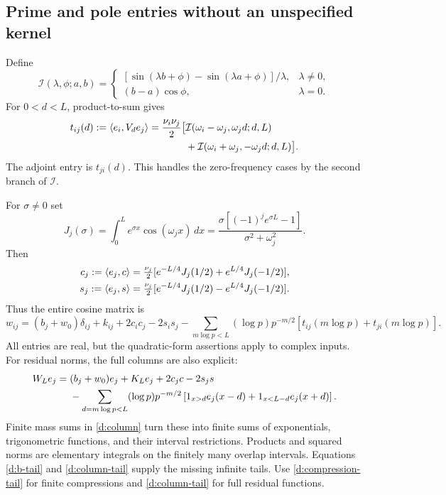 \subsection{Prime and pole entries without an unspecified kernel}
Define
\[
\mathcal I(\lambda,\phi;a,b)=
\begin{cases}
[\sin(\lambda b+\phi)-\sin(\lambda a+\phi)]/\lambda,&\lambda\ne0,\\
(b-a)\cos\phi,&\lambda=0.
\end{cases}
\]
For $0<d<L$, product-to-sum gives
\begin{align}
t_{ij}(d):=\left\langle e_i,V_de_j\right\rangle
=\frac{\nu_i\nu_j}{2}\bigl[&\mathcal I(\omega_i-\omega_j,\omega_jd;d,L)\notag\\
&+\mathcal I(\omega_i+\omega_j,-\omega_jd;d,L)\bigr].
\label{d:shift-entries}
\end{align}
The adjoint entry is $t_{ji}(d)$. This handles the zero-frequency cases
by the second branch of $\mathcal I$.

For $\sigma\ne0$ set
\[
J_j(\sigma)=\int_0^Le^{\sigma x}\cos(\omega_jx)\,dx
=\frac{\sigma[(-1)^je^{\sigma L}-1]}{\sigma^2+\omega_j^2}.
\]
Then
\begin{align*}
c_j:=\left\langle e_j,c\right\rangle&=\tfrac{\nu_j}{2}
[e^{-L/4}J_j(1/2)+e^{L/4}J_j(-1/2)],\\
s_j:=\left\langle e_j,s\right\rangle&=\tfrac{\nu_j}{2}
[e^{-L/4}J_j(1/2)-e^{L/4}J_j(-1/2)].
\end{align*}
Thus the entire cosine matrix is
\begin{equation}\label{d:W-entries}
w_{ij}=(b_j+w_0)\delta_{ij}+k_{ij}+2c_ic_j-2s_is_j
-\sum_{m\log p<L}(\log p)p^{-m/2}
[t_{ij}(m\log p)+t_{ji}(m\log p)].
\end{equation}
All entries are real, but the quadratic-form assertions apply to complex
inputs. For residual norms, the full columns are also explicit:
\begin{align}
W_Le_j={}&(b_j+w_0)e_j+K_Le_j+2c_jc-2s_js\notag\\
&-\sum_{d=m\log p<L}(\log p)p^{-m/2}
\left[1_{x>d}e_j(x-d)+1_{x<L-d}e_j(x+d)\right].
\label{d:W-columns}
\end{align}
Finite mass sums in \eqref{d:column} turn these into finite sums of
exponentials, trigonometric functions, and their interval restrictions.
Products and squared norms are elementary integrals on the finitely many
overlap intervals. Equations \eqref{d:b-tail} and \eqref{d:column-tail}
supply the missing infinite tails. Use \eqref{d:compression-tail} for
finite compressions and \eqref{d:column-tail} for full residual functions.

